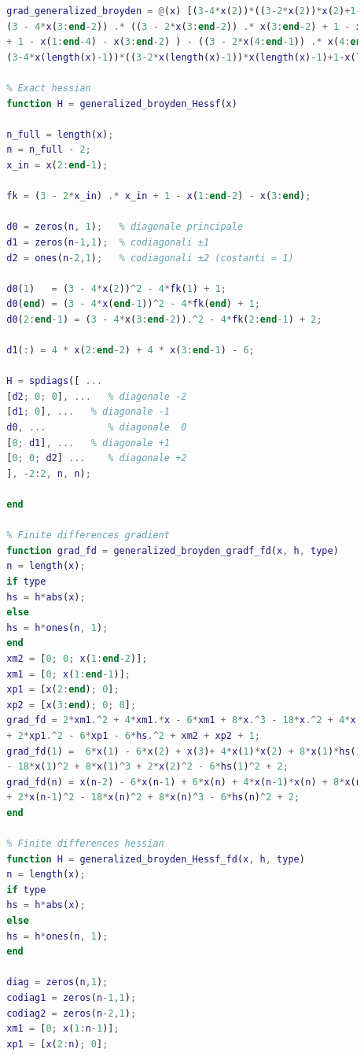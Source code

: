 \documentclass[a4paper,12pt]{article}
\begin{document}
\begin{lstlisting}[language=Matlab,caption={Full script: Modified Newton method on Generalyzed Broyden},label={lst:broyden}]
		% Exact gradient
		grad_generalized_broyden = @(x) [(3-4*x(2))*((3-2*x(2))*x(2)+1-x(1)-x(3))-((3-2*x(3))*x(3)-x(2)-x(4)+1);
		(3 - 4*x(3:end-2)) .* ((3 - 2*x(3:end-2)) .* x(3:end-2) + 1 - x(2:end-3) - x(4:end-1) ) - ((3 - 2*x(2:end-3)) .* x(2:end-3) ...
		+ 1 - x(1:end-4) - x(3:end-2) ) - ((3 - 2*x(4:end-1)) .* x(4:end-1) + 1 - x(3:end-2) - x(5:end) );
		(3-4*x(length(x)-1))*((3-2*x(length(x)-1))*x(length(x)-1)+1-x(length(x)-2)-x(length(x)))-((3-2*x(length(x)-2))*x(length(x)-2)-x(length(x)-3)-x(length(x)-1)+1)];
		
		% Exact hessian
		function H = generalized_broyden_Hessf(x)
		
		n_full = length(x);     
		n = n_full - 2;         
		x_in = x(2:end-1);      
		
		fk = (3 - 2*x_in) .* x_in + 1 - x(1:end-2) - x(3:end);
		
		d0 = zeros(n, 1);   % diagonale principale
		d1 = zeros(n-1,1);  % codiagonali ±1
		d2 = ones(n-2,1);   % codiagonali ±2 (costanti = 1)
		
		d0(1)   = (3 - 4*x(2))^2 - 4*fk(1) + 1;
		d0(end) = (3 - 4*x(end-1))^2 - 4*fk(end) + 1;
		d0(2:end-1) = (3 - 4*x(3:end-2)).^2 - 4*fk(2:end-1) + 2;
		
		d1(:) = 4 * x(2:end-2) + 4 * x(3:end-1) - 6;
		
		H = spdiags([ ...
		[d2; 0; 0], ...   % diagonale -2
		[d1; 0], ...   % diagonale -1
		d0, ...           % diagonale  0
		[0; d1], ...   % diagonale +1
		[0; 0; d2] ...    % diagonale +2
		], -2:2, n, n);
		
		end
		
		% Finite differences gradient
		function grad_fd = generalized_broyden_gradf_fd(x, h, type)
		n = length(x);
		if type
		hs = h*abs(x);
		else
		hs = h*ones(n, 1);
		end
		xm2 = [0; 0; x(1:end-2)];
		xm1 = [0; x(1:end-1)];
		xp1 = [x(2:end); 0];
		xp2 = [x(3:end); 0; 0];
		grad_fd = 2*xm1.^2 + 4*xm1.*x - 6*xm1 + 8*x.^3 - 18*x.^2 + 4*x.*xp1 + 8*x.*hs.^2 + 7.*x ...
		+ 2*xp1.^2 - 6*xp1 - 6*hs.^2 + xm2 + xp2 + 1;
		grad_fd(1) =  6*x(1) - 6*x(2) + x(3)+ 4*x(1)*x(2) + 8*x(1)*hs(1)^2 ...
		- 18*x(1)^2 + 8*x(1)^3 + 2*x(2)^2 - 6*hs(1)^2 + 2;
		grad_fd(n) = x(n-2) - 6*x(n-1) + 6*x(n) + 4*x(n-1)*x(n) + 8*x(n)*hs(n)^2 ...
		+ 2*x(n-1)^2 - 18*x(n)^2 + 8*x(n)^3 - 6*hs(n)^2 + 2;
		end
		
		% Finite differences hessian
		function H = generalized_broyden_Hessf_fd(x, h, type)
		n = length(x);
		if type
		hs = h*abs(x);
		else
		hs = h*ones(n, 1);
		end
		
		diag = zeros(n,1);
		codiag1 = zeros(n-1,1);
		codiag2 = zeros(n-2,1);
		xm1 = [0; x(1:n-1)];
		xp1 = [x(2:n); 0];
		

\end{lstlisting}
\end{document}
